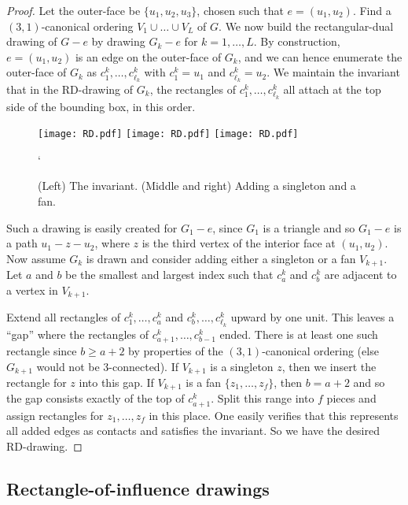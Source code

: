 \documentclass[12pt]{article}
\begin{document}
\begin{proof}
Let the outer-face be $\{u_1,u_2,u_3\}$, chosen such that $e=(u_1,u_2)$.
Find a $(3,1)$-canonical ordering $V_1\cup \dots\cup V_L$ of $G$.  We
now build the rectangular-dual drawing of $G-e$ by drawing $G_k-e$ for 
$k=1,\dots,L$.
By construction, $e=(u_1,u_2)$ is an edge on the outer-face of $G_k$, and
we can hence enumerate the outer-face of $G_k$ as $c^k_1,\dots,c^k_{\ell_k}$
with $c^k_1=u_1$ and $c^k_{\ell_k}=u_2$.  
We maintain the invariant
that in the RD-drawing of $G_k$, the rectangles of 
$c^k_1,\dots,c^k_{\ell_k}$ all attach at the top side of the bounding
box, in this order.

\begin{figure}[ht]
\hspace*{\fill}
\texttt{[image: RD.pdf]}
\hspace*{\fill}
\texttt{[image: RD.pdf]}
\hspace*{\fill}
\texttt{[image: RD.pdf]}
\hspace*{\fill}
\caption{(Left) The invariant.  (Middle and right) 
Adding a singleton and a fan.  }
\label{fig:RD}`
\end{figure}

Such a drawing is easily created for $G_1-e$, since $G_1$ is a triangle and
so $G_1-e$ is a path $u_1-z-u_2$, where $z$ is the third vertex
of the interior face at $(u_1,u_2)$.
Now assume $G_k$ is drawn and consider adding either
a singleton or a fan $V_{k+1}$.  Let $a$ and $b$ be the smallest and 
largest index such that $c^k_a$ and $c^k_b$ are adjacent to a vertex in $V_{k+1}$.  

Extend all rectangles of $c^k_1,\dots,c^k_a$ and $c^k_b,\dots,c^k_{\ell_k}$ upward
by one unit.    This leaves a ``gap'' where the rectangles
of $c^k_{a+1},\dots,c^k_{b-1}$ ended. There is at least one such rectangle
since $b\geq a+2$ by properties of the $(3,1)$-canonical ordering (else $G_{k+1}$ would not be 3-connected).  
If $V_{k+1}$ is a singleton $z$, then we insert the rectangle for $z$ into
this gap.  If $V_{k+1}$ is a fan $\{z_1,\dots,z_f\}$, then $b=a+2$
and so the gap consists exactly of the top of $c^k_{a+1}$.  Split this
range into $f$ pieces and assign rectangles for 
$z_1,\dots,z_f$ in this place.  One easily verifies that this represents
all added edges as contacts and satisfies the invariant.
So we have the desired RD-drawing.
\end{proof}


\subsection{Rectangle-of-influence drawings}
\label{sec:ri-drawing}
\end{document}
